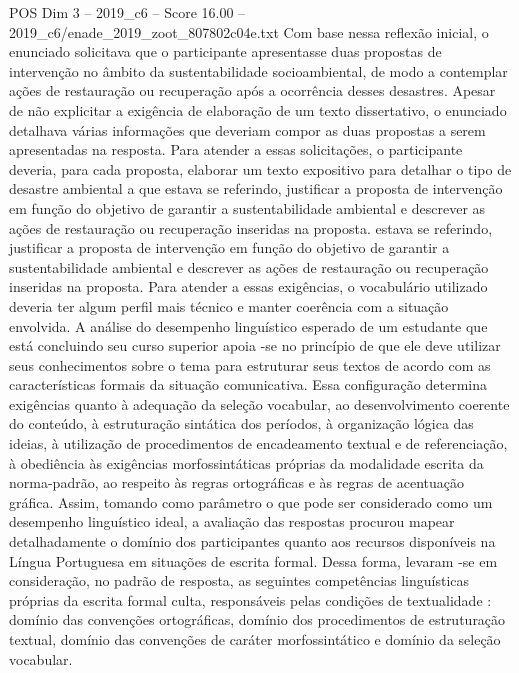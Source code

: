 \begin{textsample}{POS Dim 3 – 2019\_c6 – Score 16.00 – 2019\_c6/enade\_2019\_zoot\_807802c04e.txt}
Com base nessa reflexão inicial, o enunciado solicitava que o participante apresentasse duas propostas de intervenção no âmbito da sustentabilidade socioambiental, de modo a contemplar ações de restauração ou recuperação após a ocorrência desses desastres.
Apesar de não explicitar a exigência de elaboração de um texto dissertativo, o enunciado detalhava várias informações que deveriam compor as duas propostas a serem apresentadas na resposta.
Para atender a essas solicitações, o participante deveria, para cada proposta, elaborar um texto expositivo para detalhar o tipo de desastre ambiental a que estava se referindo, justificar a proposta de intervenção em função do objetivo de garantir a sustentabilidade ambiental e descrever as ações de restauração ou recuperação inseridas na proposta. estava se referindo, justificar a proposta de intervenção em função do objetivo de garantir a sustentabilidade ambiental e descrever as ações de restauração ou recuperação inseridas na proposta.
Para atender a essas exigências, o vocabulário utilizado deveria ter algum perfil mais técnico e manter coerência com a situação envolvida.
A análise do desempenho linguístico esperado de um estudante que está concluindo seu curso superior apoia -se no princípio de que ele deve utilizar seus conhecimentos sobre o tema para estruturar seus textos de acordo com as características formais da situação comunicativa.
Essa configuração determina exigências quanto à adequação da seleção vocabular, ao desenvolvimento coerente do conteúdo, à estruturação sintática dos períodos, à organização lógica das ideias, à utilização de procedimentos de encadeamento textual e de referenciação, à obediência às exigências morfossintáticas próprias da modalidade escrita da norma-padrão, ao respeito às regras ortográficas e às regras de acentuação gráfica.
Assim, tomando como parâmetro o que pode ser considerado como um desempenho linguístico ideal, a avaliação das respostas procurou mapear detalhadamente o domínio dos participantes quanto aos recursos disponíveis na Língua Portuguesa em situações de escrita formal.
Dessa forma, levaram -se em consideração, no padrão de resposta, as seguintes competências linguísticas próprias da escrita formal culta, responsáveis pelas condições de textualidade : domínio das convenções ortográficas, domínio dos procedimentos de estruturação textual, domínio das convenções de caráter morfossintático e domínio da seleção vocabular.

\end{textsample}
